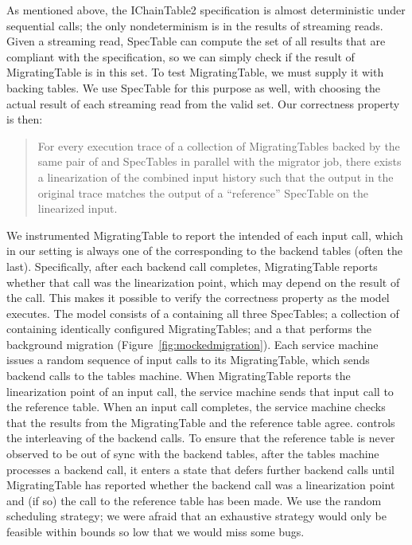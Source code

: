 As mentioned above, the IChainTable2 specification is almost deterministic under sequential calls; the only nondeterminism is in the results of streaming reads.  Given a streaming read, SpecTable can compute the set of all results that are compliant with the specification, so we can simply check if the result of MigratingTable is in this set.  To test MigratingTable, we must supply it with backing tables.  We use SpecTable for this purpose as well, with \psharp choosing the actual result of each streaming read from the valid set.  Our correctness property is then:
\begin{quote}
For every execution trace of a collection of MigratingTables backed by the same pair of  and  SpecTables in parallel with the migrator job, there exists a linearization of the combined input history such that the output in the original trace matches the output of a ``reference'' SpecTable on the linearized input.
\end{quote}
%
We instrumented MigratingTable to report the intended  of each input call, which in our setting is always one of the corresponding  to the backend tables (often the last).  Specifically, after each backend call completes, MigratingTable reports whether that call was the linearization point, which may depend on the result of the call.  This makes it possible to verify the correctness property as the model executes.  The model consists of a \psharp {} containing all three SpecTables; a collection of  containing identically configured MigratingTables; and a  that performs the background migration (Figure~\ref{fig:mockedmigration}).  Each service machine issues a random sequence of input calls to its MigratingTable, which sends backend calls to the tables machine.  When MigratingTable reports the linearization point of an input call, the service machine sends that input call to the reference table.  When an input call completes, the service machine checks that the results from the MigratingTable and the reference table agree.  \psharp controls the interleaving of the backend calls.  To ensure that the reference table is never observed to be out of sync with the backend tables, after the tables machine processes a backend call, it enters a state that defers further backend calls until MigratingTable has reported whether the backend call was a linearization point and (if so) the call to the reference table has been made.  We use the \psharp random scheduling strategy; we were afraid that an exhaustive strategy would only be feasible within bounds so low that we would miss some bugs.

